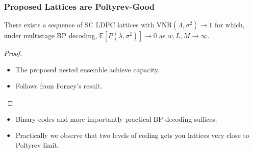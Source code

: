 \documentclass[10pt]{beamer}
\newcommand{\mbb}{\mathbb}
\begin{document}
\begin{frame}\frametitle{Proposed Lattices are Poltyrev-Good}
\begin{theorem}
There exists a sequence of SC LDPC lattices with VNR$(\Lambda,\sigma^{2})\rightarrow 1$ for which, under multistage BP decoding, $\mbb{E}\left[P(\lambda,\sigma^{2})\right]\rightarrow 0$ as $w,L,M  \rightarrow \infty$.
\end{theorem}    
\begin{proof}
\begin{itemize}
\item The proposed nested ensemble achieve capacity.
\item Follows from Forney's result.
\end{itemize}

\end{proof}
\vspace{0.3in}
\pause
\begin{itemize}
        \item Binary codes and more importantly practical BP decoding suffices. 
        \item Practically we observe that two levels of coding gets you lattices very close to Poltyrev limit.
    \end{itemize}
\end{frame}
	
\end{document}
